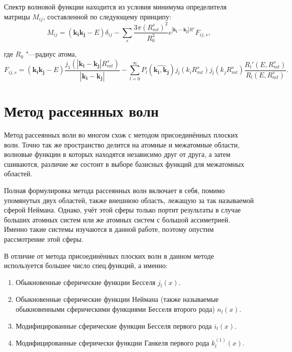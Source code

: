 Спектр волновой функции находится из условия минимума определителя матрицы
$M_{ij}$, составленной по следующему принципу:
\begin{equation}\label{eq:afw-method-5}
  M_{ij} = (\mathbf{k_i}\mathbf{k_j} - E)\delta_{ij} -
  \sum_s{
    \frac{3 \pi (R_{mt}^s)^2}{R_0^3}
    e^{\left\lvert \mathbf{k_i} - \mathbf{k_j} \right\lvert R^s}
    F_{ij,s}
  },
\end{equation}

где $R_0$ "---радиус атома,
\begin{equation}\label{eq:afw-method-6}
  F_{ij,s} =
    (\mathbf{k_i}\mathbf{k_j} - E)
    \frac
      {j_1(\left\lvert \mathbf{k_i} - \mathbf{k_j} \right\lvert R_{mt}^s)}
      {\left\lvert \mathbf{k_i} - \mathbf{k_j} \right\lvert}
    - \sum_{l = 0}^{\infty} {
      P_l(\widehat{\mathbf{k_i}, \mathbf{k_j}})
      j_l(k_i R_{mt}^s)
      j_l(k_j R_{mt}^s)
      \frac{ R_l'(E, R_{mt}^s) }{ R_l(E, R_{mt}^s) }
    }.
\end{equation}

\section{\textbf{Метод рассеянных волн}}
Метод рассеянных волн\cite{sw-method} во многом схож с методом присоединённых плоских волн. Точно так же пространство
делится на атомные и межатомные области, волновые функции в которых находятся независимо друг от друга, а затем
сшиваются, различие же состоит в выборе базисных функций для межатомных областей.

Полная формулировка метода рассеянных волн включает в себя, помимо упомянутых двух областей, также внешнюю область,
лежащую за так называемой сферой Неймана. Однако, учёт этой сферы только портит результаты в случае больших атомных
систем или же атомных систем с большой ассиметрией. Именно такие системы изучаются в данной работе, поэтому опустим
рассмотрение этой сферы.

В отличие от метода присоединённых плоских волн в данном методе используется большее число спец.функций, а именно:
\begin{enumerate}
  \item Обыкновенные сферические функции Бесселя $j_l(x)$.
  \item Обыкновенные сферические функции Неймана (также называемые обыкновенными сферическими функциями Бесселя второго
  рода) $n_l(x)$.
  \item Модифицированные сферические функции Бесселя первого рода $i_l(x)$.
  \item Модифицированные сферически функции Ганкеля первого рода $k_l^{(1)}(x)$.
\end{enumerate}

